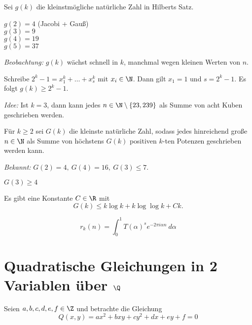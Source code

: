 \begin{defn*}
	Sei $g(k)$ die kleinstmögliche natürliche Zahl in Hilberts Satz.
\end{defn*}

\begin{exmp*}
	$g(2) = 4$ (Jacobi + Gauß)\\
	\( g(3) = 9 \)\\
	\( g(4) = 19 \)\\
	\( g(5) = 37 \)
\end{exmp*}

\emph{Beobachtung:} $g(k)$ wächst schnell in $k$, manchmal wegen kleinen Werten von $n$.

\begin{exmp*}
	Schreibe $2^k-1 = x_1^k + \dotsc + x_s^k$ mit $x_i \in \N$. Dann gilt $x_1 = 1$ und $s = 2^k-1$. Es folgt $g(k) \geq 2^k-1$.
\end{exmp*}

\emph{Idee:} Ist $k = 3$, dann kann jedes $n \in \N \setminus \{23,239\}$ als Summe von acht Kuben geschrieben werden.

\begin{defn*}
	Für $k \geq 2$ sei $G(k)$ die kleinste natürliche Zahl, sodass jedes hinreichend große $n \in \N$ als Summe von höchstens $G(k)$ positiven $k$-ten Potenzen geschrieben werden kann.
\end{defn*}

\emph{Bekannt:} $G(2) = 4,\ G(4) = 16,\ G(3) \leq 7$.

\begin{lem}\autolabel
	$G(3) \geq 4$
\end{lem}

\begin{thm*}
	Es gibt eine Konstante $C \in \R$ mit
	\[ G(k) \leq k \log k + k \log\log k + Ck. \]
\end{thm*}

\begin{lem*}
	\[ r_k(n) = \int_{0}^{1} T(\alpha)^s e^{-2\pi i \alpha n} \ d\alpha\]
\end{lem*}

\section{Quadratische Gleichungen in 2 Variablen über $\Q$}

Seien $a,b,c,d,e,f \in \Z$ und betrachte die Gleichung 
\[ Q(x,y) = ax^2+bxy+cy^2+dx+ey+f = 0 \]

